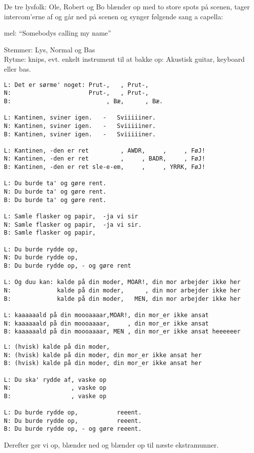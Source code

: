 \documentclass[a4paper,11pt]{article}
\begin{document}
\begin{sketch}
\scene
De tre lysfolk: Ole, Robert og Bo blænder op med to store spots på
scenen, tager intercom'erne af og går ned på scenen og synger følgende
sang a capella:


\begin{center}
{\large mel: ``Somebodys calling my name''}

Stemmer: Lys, Normal og Bas\\
Rytme: knips, evt. enkelt instrument til
at bakke op: Akustisk guitar, keyboard eller bas.
\end{center}


\begin{verbatim}
L: Det er sørme' noget: Prut-,   , Prut-,
N:                      Prut-,   , Prut-,
B:                           , Bæ,      , Bæ.

L: Kantinen, sviner igen.   -   Sviiiiiner.
N: Kantinen, sviner igen.   -   Sviiiiiner.
B: Kantinen, sviner igen.   -   Sviiiiiner.

L: Kantinen, -den er ret         , AWDR,     ,     , FøJ!
N: Kantinen, -den er ret         ,     , BADR,     , FøJ!
B: Kantinen, -den er ret sle-e-em,     ,     , YRRK, FøJ!

L: Du burde ta' og gøre rent.
N: Du burde ta' og gøre rent. 
B: Du burde ta' og gøre rent.

L: Samle flasker og papir,  -ja vi sir
N: Samle flasker og papir,  -ja vi sir.
B: Samle flasker og papir,

L: Du burde rydde op,
N: Du burde rydde op,
B: Du burde rydde op, - og gøre rent

L: Og duu kan: kalde på din moder, MOAR!, din mor arbejder ikke her
N:             kalde på din moder,      , din mor arbejder ikke her
B:             kalde på din moder,   MEN, din mor arbejder ikke her

L: kaaaaaald på din moooaaaar,MOAR!, din mor_er ikke ansat 
N: kaaaaaald på din moooaaaar,     , din mor_er ikke ansat 
B: kaaaaaald på din moooaaaar, MEN , din mor_er ikke ansat heeeeeer
\end{verbatim}
\pagebreak
\begin{verbatim}
L: (hvisk) kalde på din moder, 
N: (hvisk) kalde på din moder, din mor_er ikke ansat her
B: (hvisk) kalde på din moder, din mor_er ikke ansat her

L: Du ska' rydde af, vaske op
N:                 , vaske op
B:                 , vaske op

L: Du burde rydde op,           reeent.
N: Du burde rydde op,           reeent.
B: Du burde rydde op, - og gøre reeent.
\end{verbatim}

\scene
Derefter gør vi op, blænder ned og blænder op til næste ekstramunner.

\end{sketch}
\end{document}
